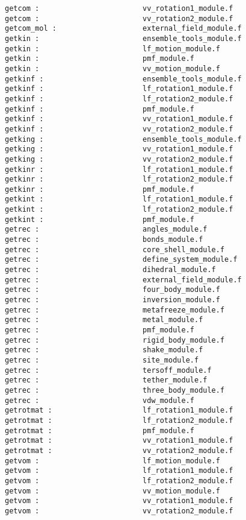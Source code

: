 \begin{verbatim}
getcom :                        vv_rotation1_module.f
getcom :                        vv_rotation2_module.f
getcom_mol :                    external_field_module.f
getkin :                        ensemble_tools_module.f 
getkin :                        lf_motion_module.f 
getkin :                        pmf_module.f 
getkin :                        vv_motion_module.f 
getkinf :                       ensemble_tools_module.f 
getkinf :                       lf_rotation1_module.f 
getkinf :                       lf_rotation2_module.f 
getkinf :                       pmf_module.f 
getkinf :                       vv_rotation1_module.f 
getkinf :                       vv_rotation2_module.f 
getking :                       ensemble_tools_module.f
getking :                       vv_rotation1_module.f
getking :                       vv_rotation2_module.f
getkinr :                       lf_rotation1_module.f 
getkinr :                       lf_rotation2_module.f 
getkinr :                       pmf_module.f 
getkint :                       lf_rotation1_module.f 
getkint :                       lf_rotation2_module.f 
getkint :                       pmf_module.f 
getrec :                        angles_module.f
getrec :                        bonds_module.f
getrec :                        core_shell_module.f
getrec :                        define_system_module.f
getrec :                        dihedral_module.f
getrec :                        external_field_module.f
getrec :                        four_body_module.f
getrec :                        inversion_module.f
getrec :                        metafreeze_module.f
getrec :                        metal_module.f
getrec :                        pmf_module.f
getrec :                        rigid_body_module.f
getrec :                        shake_module.f
getrec :                        site_module.f
getrec :                        tersoff_module.f
getrec :                        tether_module.f
getrec :                        three_body_module.f
getrec :                        vdw_module.f
getrotmat :                     lf_rotation1_module.f
getrotmat :                     lf_rotation2_module.f
getrotmat :                     pmf_module.f
getrotmat :                     vv_rotation1_module.f
getrotmat :                     vv_rotation2_module.f
getvom :                        lf_motion_module.f
getvom :                        lf_rotation1_module.f
getvom :                        lf_rotation2_module.f
getvom :                        vv_motion_module.f
getvom :                        vv_rotation1_module.f
getvom :                        vv_rotation2_module.f

\end{verbatim}
